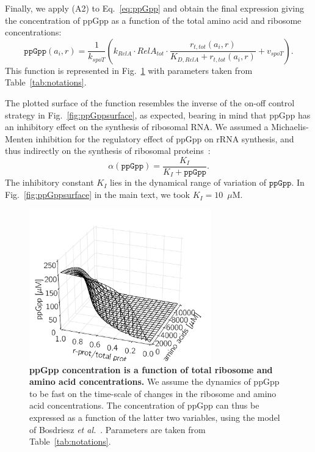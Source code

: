 Finally, we apply (A2) to Eq.~\ref{eq:ppGpp} and obtain the final expression giving the concentration of ppGpp as a function of the total amino acid and ribosome concentrations:
\begin{equation}
\texttt{ppGpp}(a_i, r) = \frac{1}{k_{spoT}} \left( k_{RelA} \cdot RelA_{tot} \cdot \frac{r_{t,tot}(a_i, r)}{K_{D,RelA} + r_{t,tot}(a_i,r)} + v_{spoT} \right).
\end{equation}
This function is represented in Fig.~\ref{fig:ppGpp} with parameters taken from Table~\ref{tab:notations}.

The plotted surface of the function resembles the inverse of the on-off control strategy in Fig.~\ref{fig:ppGppsurface}, as expected, bearing in mind that ppGpp has an inhibitory effect on the synthesis of ribosomal RNA.
We assumed a Michaelis-Menten inhibition for the regulatory effect of ppGpp on rRNA synthesis, and thus indirectly on the synthesis of ribosomal proteins~\cite{potrykus_pppgpp_2008,keener_regulation_1996}:
\begin{equation}
\alpha (\texttt{ppGpp}) = \frac{K_I}{K_I + \texttt{ppGpp}}.
\end{equation}
The inhibitory constant $K_I$ lies in the dynamical range of variation of $\texttt{ppGpp}$.
In Fig.~\ref{fig:ppGppsurface} in the main text, we took $K_I = 10$~$\mu$M.

\begin{figure}[p]
\centering
\includegraphics[width=0.7\textwidth]{./Fig/FigS4-1}
\caption[ppGpp concentration is a function of total ribosome and amino acid concentrations.]
{
{\bf ppGpp concentration is a function of total ribosome and amino acid concentrations.}\newline
We assume the dynamics of ppGpp to be fast on the time-scale of changes in the ribosome and amino acid concentrations.
The concentration of ppGpp can thus be expressed as a function of the latter two variables, using the model of Bosdriesz \textit{et al.}~\cite{bosdriesz_how_2015}.
Parameters are taken from Table~\ref{tab:notations}.
}
\label{fig:ppGpp}
\end{figure}

